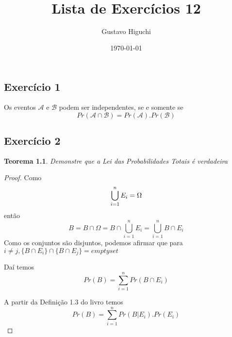 \documentclass{article}
\title{Lista de Exercícios 12}
\author{Gustavo Higuchi}
\date{\today}
\begin{document}
\maketitle

\tableofcontents
\newpage


\chapter{}
\section{Exercício 1}
Os eventos $\mathcal{A}$ e $\mathcal{B}$ podem ser independentes, se e somente se
\begin{equation}
 	Pr(\mathcal{A} \cap \mathcal{B}) = Pr(\mathcal{A}) . Pr(\mathcal{B})
 \end{equation} 

\section{Exercício 2}
\newtheorem{teo1}{Teorema}
\begin{teo1}
    Demonstre que a Lei das Probabilidades Totais é verdadeira
\end{teo1}
\begin{proof}
    \hfill \break
    Como 
    \begin{equation}
    \notag
        \bigcup_{i=1}^n E_i = \Omega
    \end{equation}
    então
    \begin{equation}
    	B = B \cap \Omega = B \cap \bigcup_{i=1}^{n}E_i = \bigcup_{i=1}^n {B \cap E_i}
    \end{equation}
    Como os conjuntos são disjuntos, podemos afirmar que para $i \neq j, \{B \cap E_i\} \cap \{B \cap E_j\} = emptyset$
    
    Daí temos
    \begin{equation}
        Pr(B) = \sum\limits_{i = 1}^{n}Pr(B \cap E_i)
    \end{equation}

    A partir da Definição 1.3 do livro temos
    \begin{equation}
    	Pr(B) = \sum\limits_{i = 1}^{n}Pr(B | E_i) . Pr(E_i)
    \end{equation}
\end{proof}
\end{document}
